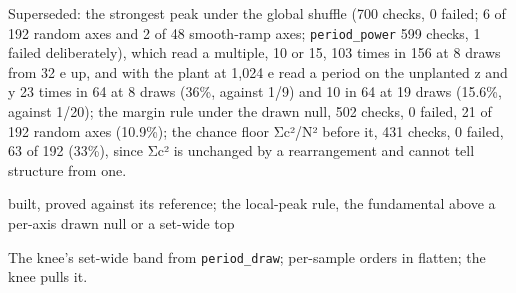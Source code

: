 \begin{description}
Superseded: the strongest peak under the global shuffle (700 checks, 0 failed; 6 of 192 random axes and 2 of 48 smooth-ramp axes; \texttt{period\_\allowbreak{}power} 599 checks, 1 failed deliberately), which read a multiple, 10 or 15, 103 times in 156 at 8 draws from 32 e up, and with the plant at 1,024 e read a period on the unplanted z and y 23 times in 64 at 8 draws (36\%, against 1/9) and 10 in 64 at 19 draws (15.6\%, against 1/20); the margin rule under the drawn null, 502 checks, 0 failed, 21 of 192 random axes (10.9\%); the chance floor Σc²/N² before it, 431 checks, 0 failed, 63 of 192 (33\%), since Σc² is unchanged by a rearrangement and cannot tell structure from one.
\item[{status}] built, proved against its reference; the local-peak rule, the fundamental above a per-axis drawn null or a set-wide top
\item[{next}] The knee's set-wide band from \texttt{period\_\allowbreak{}draw}; per-sample orders in flatten; the knee pulls it.
\end{description}

